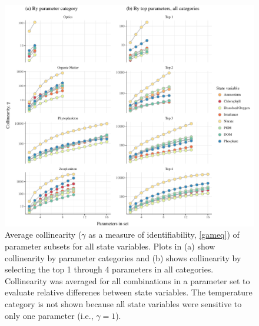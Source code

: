 \documentclass[review]{elsarticle}\usepackage[]{graphicx}\usepackage[]{color}
\makeatletter
\def\maxwidth{ %
  \ifdim\Gin@nat@width>\linewidth
    \linewidth
  \else
    \Gin@nat@width
  \fi
}
\makeatother
\begin{document}
\begin{figure}[!ht]

{\centering \includegraphics[width=\maxwidth]{figs/identploall-1} 

}

\caption[Average collinearity ($\gamma$ as a measure of identifiability, \cref{gameq}) of parameter subsets for all state variables]{Average collinearity ($\gamma$ as a measure of identifiability, \cref{gameq}) of parameter subsets for all state variables.  Plots in (a) show collinearity by parameter categories and (b) shows collinearity by selecting the top 1 through 4 parameters in all categories.  Collinearity was averaged for all combinations in a parameter set to evaluate relative differenes between state variables.  The temperature category is not shown because all state variables were sensitive to only one parameter (i.e., $\gamma = 1$).}\label{fig:identploall}
\end{figure}
\end{document}
